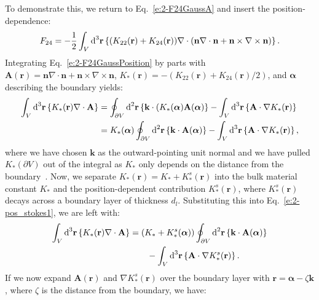 To demonstrate this, we return to Eq.~\ref{e:2-F24GaussA} and insert the position-dependence:
\begin{equation}
  F_{24} = -\frac{1}{2}\int_{V}\textup{d}^3\mathbf{r} \left \{ (K_{22} (\mathbf{r}) + K_{24}(\mathbf{r})) \nabla \cdot (\mathbf{n} \nabla \cdot \mathbf{n} + \mathbf{n} \times \nabla \times \mathbf{n}) \right \}.\label{e:2-F24GaussPosition}
\end{equation}
Integrating Eq.~\ref{e:2-F24GaussPosition} by parts with $\mathbf{A}(\mathbf{r}) = \mathbf{n} \nabla \cdot \mathbf{n} + \mathbf{n} \times \nabla \times \mathbf{n}$, \newline $K_*(\mathbf{r}) = -(K_{22} (\mathbf{r}) + K_{24}(\mathbf{r})/2)$, and $\bm{\alpha}$ describing the boundary yields:
\begin{align}
  \int_{V}\textup{d}^3\mathbf{r} \left \{ K_{*} (\mathbf{r}) \nabla \cdot \mathbf{A} \right \} &=
  \oint_{\partial V}\textup{d}^2 \mathbf{r} \left \{ \mathbf{k} \cdot (K_{*} (\bm{\alpha}) \mathbf{A}(\bm{\alpha}) \right \} -  \int_{V} \textup{d}^3\mathbf{r} \left \{ \mathbf{A} \cdot \nabla K_{*} (\mathbf{r}) \right \}  \\ &=
  K_*(\bm{\alpha}) \oint_{\partial V} \textup{d}^2\mathbf{r} \left \{ \mathbf{k} \cdot \mathbf{A}(\bm{\alpha})\right \} - \int_{V} \textup{d}^3\mathbf{r} \left \{ \mathbf{A} \cdot \nabla K_{*} (\mathbf{r}) \right \}, \label{e:2-pos_stokes1}
\end{align}
where we have chosen $\mathbf{k}$ as the outward-pointing unit normal and we have pulled $K_*(\partial V)$ out of the integral as $K_*$ only depends on the distance from the boundary~\cite{RN55}.
Now, we separate $K_*(\mathbf{r}) = K_* + K_*^s(\mathbf{r})$ into the bulk material constant $K_*$ and the position-dependent contribution $K_*^s(\mathbf{r})$, where $K_*^s(\mathbf{r})$ decays across a boundary layer of thickness $d_l$.
Substituting this into Eq.~\ref{e:2-pos_stokes1}, we are left with:
\begin{align}
  \int_{V}\textup{d}^3\mathbf{r} \left \{ K_{*} (\mathbf{r}) \nabla \cdot \mathbf{A} \right \} &=
  (K_*+K_*^s(\bm{\alpha})) \oint_{\partial V} \textup{d}^2\mathbf{r} \left \{ \mathbf{k} \cdot \mathbf{A}(\bm{\alpha})\right \} \nonumber \\&
  \quad \quad - \int_{V} \textup{d}^3\mathbf{r} \left \{ \mathbf{A} \cdot \nabla K_{*}^s (\mathbf{r}) \right \}. \label{e:2-pos_stokes2}
\end{align}
If we now expand $\mathbf{A}(\mathbf{r})$ and $\nabla K_*^s(\mathbf{r})$ over the boundary layer with $\mathbf{r} = \bm{\alpha} - \zeta \mathbf{k}$, where $\zeta$ is the distance from the boundary, we have:
